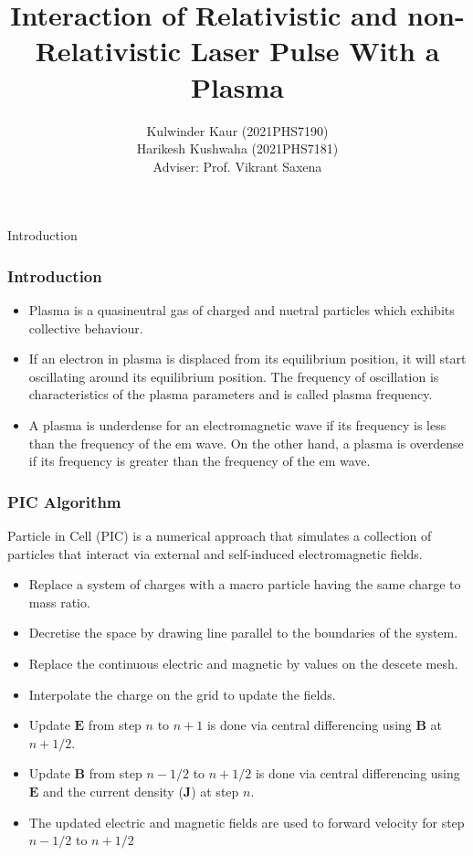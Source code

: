 \documentclass{beamer}
\title[Interaction of Laser with Plasma]{Interaction of Relativistic and non-Relativistic Laser Pulse With a Plasma}
\date{}
\institute[IITD]{\large Indian Institute of Technology, Delhi}
\author[K.K., H.K.]{Kulwinder Kaur (2021PHS7190)\\ Harikesh Kushwaha (2021PHS7181)\\[3mm]Adviser: Prof. Vikrant Saxena}
\begin{document}
\maketitle
\begin{frame}{Introduction}
    \frametitle{Introduction}
    \small
    \begin{itemize}
       \item Plasma is a quasineutral gas of charged and nuetral particles which exhibits collective behaviour.
       \item If an electron in plasma is displaced from its equilibrium position, it will start oscillating around its equilibrium position. The frequency of oscillation is characteristics of the plasma parameters and is called plasma frequency.
       \item A plasma is underdense for an electromagnetic wave if its frequency is less than the frequency of the em wave. On the other hand, a plasma is overdense if its frequency is greater than the frequency of the em wave.
    \end{itemize}
\end{frame}
\begin{frame}
    \small
    \frametitle{PIC Algorithm}
    Particle in Cell (PIC) is a numerical approach that simulates a collection of particles that interact via external and self-induced electromagnetic fields.
    \begin{itemize}
        \item Replace a system of charges with a macro particle having the same charge to mass ratio.
        \item Decretise the space by drawing line parallel to the boundaries of the system.
        \item Replace the continuous electric and magnetic by values on the descete mesh.
        \item Interpolate the charge on the grid to update the fields.
        \item Update $\mathbf{E}$ from step $n$ to $n+1$ is done via central differencing using $\mathbf{B}$ at $n+1/2$.
        \item Update $\mathbf{B}$ from step $n-1/2$ to $n+1/2$ is done via central differencing using $\mathbf{E}$ and the current density ($\textbf{J}$) at step $n$.
        \item The updated electric and magnetic fields are used to forward velocity for step $n-1/2$ to $n+1/2$
    \end{itemize}
\end{frame}
\end{document}
